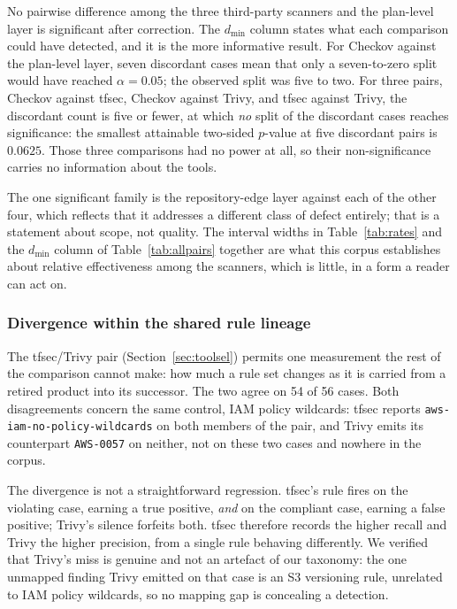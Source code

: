 \documentclass[smallextended]{svjour3}
\begin{document}
No pairwise difference among the three third-party scanners and the plan-level
layer is significant after correction. The $d_{\min}$ column states what each
comparison could have detected, and it is the more informative result. For
Checkov against the plan-level layer, seven discordant cases mean that only a
seven-to-zero split would have reached $\alpha = 0.05$; the observed split was
five to two. For three pairs, Checkov against tfsec, Checkov against Trivy, and
tfsec against Trivy, the discordant count is five or fewer, at which \emph{no}
split of the discordant cases reaches significance: the smallest attainable
two-sided $p$-value at five discordant pairs is $0.0625$. Those three comparisons
had no power at all, so their non-significance carries no information about the
tools.

The one significant family is the repository-edge layer against each of the
other four, which reflects that it addresses a different class of defect
entirely; that is a statement about scope, not quality. The interval widths in
Table~\ref{tab:rates} and the $d_{\min}$ column of Table~\ref{tab:allpairs}
together are what this corpus establishes about relative effectiveness among the
scanners, which is little, in a form a reader can act on.

\subsubsection{Divergence within the shared rule lineage}
The tfsec/Trivy pair (Section~\ref{sec:toolsel}) permits one measurement the rest
of the comparison cannot make: how much a rule set changes as it is carried from
a retired product into its successor. The two agree on 54 of 56 cases. Both
disagreements concern the same control, IAM policy wildcards: tfsec reports
\texttt{aws-iam-no-policy-wildcards} on both members of the pair, and Trivy emits
its counterpart \texttt{AWS-0057} on neither, not on these two cases and nowhere
in the corpus.

The divergence is not a straightforward regression. tfsec's rule fires on the
violating case, earning a true positive, \emph{and} on the compliant case,
earning a false positive; Trivy's silence forfeits both. tfsec therefore records
the higher recall and Trivy the higher precision, from a single rule behaving
differently. We verified that Trivy's miss is genuine and not an artefact of our
taxonomy: the one unmapped finding Trivy emitted on that case is an S3
versioning rule, unrelated to IAM policy wildcards, so no mapping gap is
concealing a detection.
\end{document}
